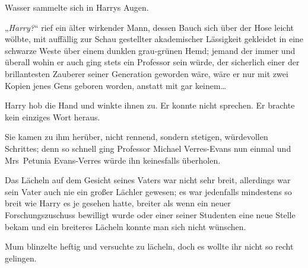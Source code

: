 Wasser sammelte sich in Harrys Augen.

„\emph{Harry?}“ rief ein älter wirkender Mann, dessen Bauch sich über der Hose leicht wölbte, mit auffällig zur Schau gestellter akademischer Lässigkeit gekleidet in eine schwarze Weste über einem dunklen grau-grünen Hemd; jemand der immer und überall wohin er auch ging stets ein Professor sein würde, der sicherlich einer der brillantesten Zauberer seiner Generation geworden wäre, wäre er nur mit zwei Kopien jenes Gens geboren worden, anstatt mit gar keinem…

Harry hob die Hand und winkte ihnen zu. Er konnte nicht sprechen. Er brachte kein einziges Wort heraus.

Sie kamen zu ihm herüber, nicht rennend, sondern stetigen, würdevollen Schrittes; denn so schnell ging Professor Michael Verres-Evans nun einmal und Mrs~Petunia Evans-Verres würde ihn keinesfalls überholen.

Das Lächeln auf dem Gesicht seines Vaters war nicht sehr breit, allerdings war sein Vater auch nie ein großer Lächler gewesen; es war jedenfalls mindestens so breit wie Harry es je gesehen hatte, breiter als wenn ein neuer Forschungszuschuss bewilligt wurde oder einer seiner Studenten eine neue Stelle bekam und ein breiteres Lächeln konnte man sich nicht wünschen.

Mum blinzelte heftig und versuchte zu lächeln, doch es wollte ihr nicht so recht gelingen.

